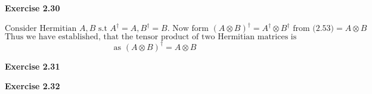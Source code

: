 \documentclass{article}
\begin{document}
\bigskip

\begin{framed}
    \noindent \textbf{Exercise 2.30}
    
    \medskip
    $$
    \text{Consider Hermitian }A, B \text{ s.t } A^{\dagger}=A, B^{\dagger} = B. \text{ Now form } (A \otimes B)^{\dagger} = A^{\dagger} \otimes B^{\dagger} \text{ from (2.53)} = A \otimes B
    $$
    $$
    \text{Thus we have established, that the tensor product of two Hermitian matrices is Hermitian,}
    $$
    $$
    \text{as } (A \otimes B)^{\dagger} = A \otimes B
    $$
    
\end{framed}

\bigskip

\begin{framed}
    \noindent \textbf{Exercise 2.31}
    
    \medskip

\end{framed}

\bigskip

\begin{framed}
    \noindent \textbf{Exercise 2.32}
    
    \medskip
    
    
\end{framed}

\bigskip
\end{document}
